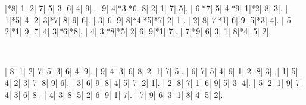 \documentclass{cons-beamer}
\begin{document}
\begin{frame}[fragile]
  \begin{center}
    \vspace{2mm}
    \PuzzleUnitlength=11pt
    \renewcommand*\SudokuLinethickness{1pt}
    \renewcommand*\PuzzleFont{\sf\tiny}
    \begin{Sudoku}
      |*8| 1| 2| 7| 5| 3| 6| 4| 9|.
      | 9| 4|*3|*6| 8| 2| 1| 7| 5|.
      | 6|*7| 5| 4|*9| 1|*2| 8| 3|.
      | 1|*5| 4| 2| 3|*7| 8| 9| 6|.
      | 3| 6| 9| 8|*4|*5|*7| 2| 1|.
      | 2| 8| 7|*1| 6| 9| 5|*3| 4|.
      | 5| 2|*1| 9| 7| 4| 3|*6|*8|.
      | 4| 3|*8|*5| 2| 6| 9|*1| 7|.
      | 7|*9| 6| 3| 1| 8|*4| 5| 2|.
    \end{Sudoku}
    ~~~~~
    \PuzzleSolution
    \begin{Sudoku}
      | 8| 1| 2| 7| 5| 3| 6| 4| 9|.
      | 9| 4| 3| 6| 8| 2| 1| 7| 5|.
      | 6| 7| 5| 4| 9| 1| 2| 8| 3|.
      | 1| 5| 4| 2| 3| 7| 8| 9| 6|.
      | 3| 6| 9| 8| 4| 5| 7| 2| 1|.
      | 2| 8| 7| 1| 6| 9| 5| 3| 4|.
      | 5| 2| 1| 9| 7| 4| 3| 6| 8|.
      | 4| 3| 8| 5| 2| 6| 9| 1| 7|.
      | 7| 9| 6| 3| 1| 8| 4| 5| 2|.
    \end{Sudoku}
  \end{center}
  \begin{example}
    \vspace{-0.5em}
    
    \vspace{-0.5em}
  \end{example}
\end{frame}

\begin{frame}
	\centering
	
	
\end{frame}
\end{document}
